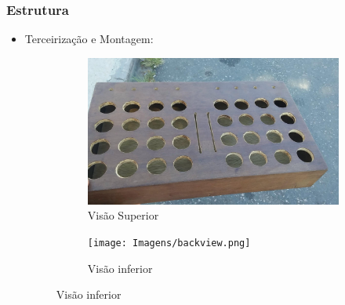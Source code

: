 \documentclass[hyperref={pdfpagelabels=false}]{beamer}
\begin{document}
\begin{frame}
\begin{figure}[H]
                    \label{fig:madeiratriplex}
                \end{figure}

            \end{frame}

            \begin{frame}\frametitle{Estrutura}

                \begin{itemize}
                  \item Terceirização e Montagem:
                        \begin{figure}[H]
                            \centering
                            \begin{subfigure}[b]{.45\textwidth}
                                \centering
                                \includegraphics[scale=0.05]{Imagens/x002.jpg}
                            	\caption[Visão Superior]{Visão Superior}
                            	\label{fig:x002}
                            \end{subfigure} %
                            \begin{subfigure}[b]{.45\textwidth}
                                \centering
                            	\texttt{[image: Imagens/backview.png]}
                            	\caption[Visão Inferior]{Visão inferior}
                            	\label{fig:backview}
                            \end{subfigure}

                            \label{fig:madeiratriplex}
                        \end{figure}


\end{itemize}
\end{frame}
\end{document}
